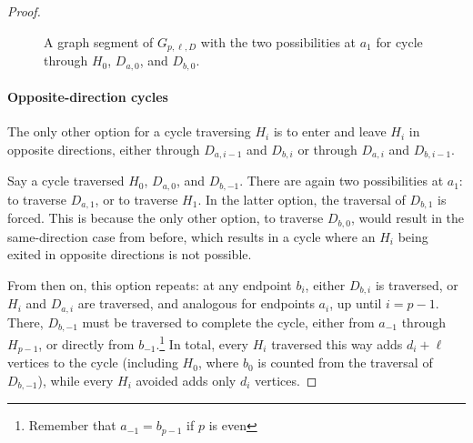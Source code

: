 \begin{proof}
\begin{figure}
\begin{subfigure}{0.45\textwidth}
{
    }
    \caption{}
    \label{fig:same-side:closed}
    \end{subfigure}

    \caption{A graph segment of $G_{p,\ell,D}$ with the two possibilities at $a_1$ for cycle through $H_0$, $D_{a,0}$, and $D_{b,0}$.}
    \label{fig:same-side}
\end{figure}

\paragraph{Opposite-direction cycles}
The only other option for a cycle traversing $H_i$ is to enter and leave
$H_i$ in opposite directions, either through $D_{a,i-1}$ and $D_{b,i}$ or
through $D_{a,i}$ and $D_{b,i-1}$.

Say a cycle traversed $H_0$, $D_{a,0}$, and $D_{b,-1}$. There are again two possibilities at $a_1$: to traverse $D_{a,1}$, or to traverse $H_1$. In the latter option, the traversal of $D_{b,1}$ is forced. This is because the only other option, to traverse $D_{b,0}$, would result in the same-direction case from before, which results in a cycle where an $H_i$ being exited in opposite directions is not possible. 

From then on, this option repeats: at any endpoint $b_i$, either $D_{b,i}$ is traversed, or $H_i$ and $D_{a,i}$ are traversed, and analogous for endpoints $a_i$, up until $i=p-1$. There, $D_{b,-1}$ must be traversed to complete the cycle, either from $a_{-1}$ through $H_{p-1}$, or directly from $b_{-1}$.\footnote{Remember that $a_{-1} = b_{p-1}$ if $p$ is even} In total, every $H_i$ traversed this way adds $d_i+\ell$ vertices to the cycle (including $H_0$, where $b_0$ is counted from the traversal of $D_{b,-1}$), while every $H_i$ avoided adds only $d_i$ vertices.


\end{proof}
